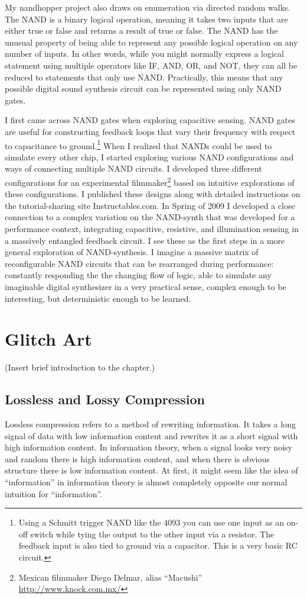 \documentclass{thesis}
\begin{document}
	My nandhopper project\cite{kyle_mcdonald_nandhopper_2008} also draws on enumeration via directed random walks. The NAND is a binary logical operation, meaning it takes two inputs that are either true or false and returns a result of true or false. The NAND has the unusual property of being able to represent any possible logical operation on any number of inputs. In other words, while you might normally express a logical statement using multiple operators like IF, AND, OR, and NOT, they can all be reduced to statements that only use NAND. Practically, this means that any possible digital sound synthesis circuit can be represented using only NAND gates.
	
	I first came across NAND gates when exploring capacitive sensing. NAND gates are useful for constructing feedback loops that vary their frequency with respect to capacitance to ground.\footnote{Using a Schmitt trigger NAND like the 4093 you can use one input as an on-off switch while tying the output to the other input via a resistor. The feedback input is also tied to ground via a capacitor. This is a very basic RC circuit.} When I realized that NANDs could be used to simulate every other chip, I started exploring various NAND configurations and ways of connecting multiple NAND circuits. I developed three different configurations for an experimental filmmaker\footnote{Mexican filmmaker Diego Delmar, alias ``Macushi'' \url{http://www.knock.com.mx/}} based on intuitive explorations of these configurations. I published these designs along with detailed instructions on the tutorial-sharing site Instructables.com. In Spring of 2009 I developed a close connection to a complex variation on the NAND-synth that was developed for a performance context, integrating capacitive, resistive, and illumination sensing in a massively entangled feedback circuit. I see these as the first steps in a more general exploration of NAND-synthesis. I imagine a massive matrix of reconfigurable NAND circuits that can be rearranged during performance: constantly responding the the changing flow of logic, able to simulate any imaginable digital synthesizer in a very practical sense, complex enough to be interesting, but deterministic enough to be learned.
	
\chapter{Glitch Art}
(Insert brief introduction to the chapter.)

\section{Lossless and Lossy Compression}
	Lossless compression refers to a method of rewriting information. It takes a long signal of data with low information content and rewrites it as a short signal with high information content. In information theory, when a signal looks very noisy and random there is high information content, and when there is obvious structure there is low information content. At first, it might seem like the idea of ``information'' in information theory is almost completely opposite our normal intuition for ``information''.
	
\end{document}
